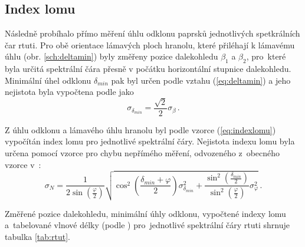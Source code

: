 \documentclass{../concepts/titul_protokol_p/prepareprotokol} %
\begin{document}
\subsection{Index lomu}
Následně probíhalo přímo měření úhlu odklonu paprsků jednotlivých
spetkrálních čar rtuti. Pro obě orientace lámavých ploch hranolu,
které přiléhají k lámavému úhlu (obr. \ref{sch:deltamin}) byly
změřeny pozice dalekohledu $\beta_1$ a $\beta_2$, pro~které byla
určitá spektrální čára přesně v počátku horizontální stupnice 
dalekohledu. Minimální úhel odklonu $\delta_{min}$ pak byl určen
podle vztahu (\ref{eq:deltamin}) a jeho nejistota byla vypočtena
podle \cite{englich} jako
\begin{equation}\label{sigmadeltamin}
    \sigma_{\delta_{min}} = \frac{\sqrt{2}}{2} \sigma_{\beta} \, .
\end{equation}

Z úhlu odklonu a lámavého úhlu hranolu byl podle vzorce 
(\ref{eq:indexlomu}) vypočítán index lomu pro jednotlivé spektrální
čáry. Nejistota indexu lomu byla určena pomocí vzorce pro chybu nepřímého
měření, odvozeného z~obecného vzorce v~\cite{englich}:
\begin{equation}\label{eq:sigmaN}
    \sigma_N = \frac{1}{2 \sin \left(\frac{\varphi}{2}\right)} \sqrt{ 
    \cos^2 \left(\frac{\delta_{min} + \varphi}{2}\right)
    \sigma_{\delta_{min}}^2 + \frac{\sin^2 
    \left(\frac{\delta_{min}}{2}\right)}{\sin^2 
    \left(\frac{\varphi}{2}\right)}
    \sigma_\varphi^2 } \, .
\end{equation}

Změřené pozice dalekohledu, minimální úhly odklonu, vypočtené indexy
lomu a~tabelované vlnové délky (podle \cite{tabulka}) pro~jednotlivé
spektrální čáry rtuti shrnuje tabulka \ref{tab:rtut}.
\end{document}
